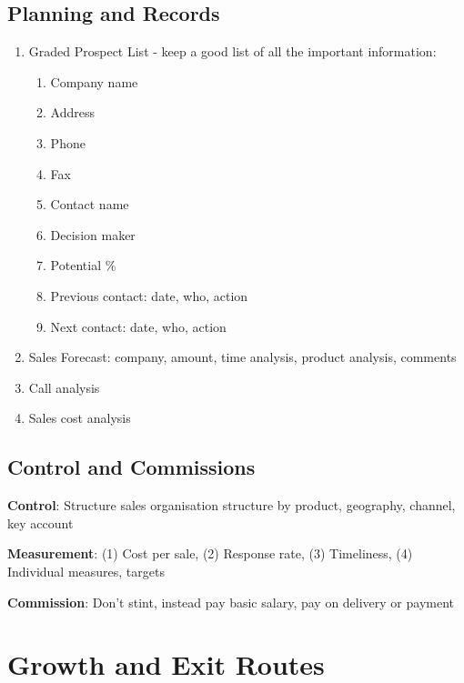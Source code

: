 \documentclass{article}
\begin{document}
\begin{multicols}{2}
\subsection{Planning and Records}
\begin{enumerate}
    \item Graded Prospect List - keep a good list of all the important information:
    \begin{enumerate}
        \item Company name
        \item Address
        \item Phone
        \item Fax
        \item Contact name
        \item Decision maker
        \item Potential \%
        \item Previous contact: date, who, action
        \item Next contact: date, who, action
    \end{enumerate}
    \item Sales Forecast: company, amount, time analysis, product analysis, comments
    \item Call analysis
    \item Sales cost analysis
\end{enumerate}

\subsection{Control and Commissions}
\textbf{Control}: Structure sales organisation structure by product, geography, channel, key account

\noindent
\textbf{Measurement}: (1) Cost per sale, (2) Response rate, (3) Timeliness, (4) Individual measures, targets

\noindent
\textbf{Commission}: Don't stint, instead pay basic salary, pay on delivery or payment

\section{Growth and Exit Routes}

\end{multicols}
\end{document}
